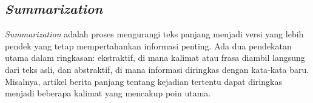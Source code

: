 \subsection{\textit{Summarization}}

\textit{Summarization} adalah proses mengurangi teks panjang menjadi versi yang lebih pendek yang tetap mempertahankan informasi penting. Ada dua pendekatan utama dalam ringkasan: ekstraktif, di mana kalimat atau frasa diambil langsung dari teks asli, dan abstraktif, di mana informasi diringkas dengan kata-kata baru. Misalnya, artikel berita panjang tentang kejadian tertentu dapat diringkas menjadi beberapa kalimat yang mencakup poin utama.
